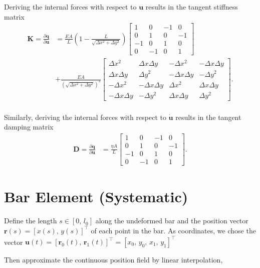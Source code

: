 Deriving the internal forces with respect to $\boldsymbol{u}$ results in the tangent stiffness matrix
%
\begin{align*}
\boldsymbol{K} = \frac{\partial \boldsymbol{q}}{\partial \boldsymbol{u}} &=
\frac{EA}{L}\left(1 - \frac{L}{\sqrt{\Delta x^2 + \Delta y^2}}\right)
\begin{bmatrix}
1 & 0 & -1 & 0\\
0 & 1 & 0 & -1\\
-1 & 0 & 1 & 0\\
0 & -1 & 0 & 1
\end{bmatrix}\\
&+
\frac{EA}{(\sqrt{\Delta x^2 + \Delta y^2})^{3}}
\begin{bmatrix}
\Delta x^2 & \Delta x \Delta y & -\Delta x^2 & -\Delta x \Delta y\\
\Delta x \Delta y & \Delta y^2 & -\Delta x \Delta y & - \Delta y^2\\
-\Delta x^2 & -\Delta x \Delta y & \Delta x^2 & \Delta x \Delta y\\
-\Delta x \Delta y & -\Delta y^2 & \Delta x \Delta y & \Delta y^2
\end{bmatrix}.\\
\end{align*}

Similarly, deriving the internal forces with respect to $\dot{\boldsymbol{u}}$ results in the tangent damping matrix
%
\begin{align*}
\boldsymbol{D} = \frac{\partial \boldsymbol{q}}{\partial \dot{\boldsymbol{u}}} &=
\frac{\eta A}{L}
\begin{bmatrix}
1 & 0 & -1 & 0\\
0 & 1 & 0 & -1\\
-1 & 0 & 1 & 0\\
0 & -1 & 0 & 1
\end{bmatrix}.
\end{align*}

\newpage
\section{Bar Element (Systematic)}

Define the length $s \in [0,\,l_{0}]$ along the undeformed bar and the position vector $\boldsymbol{r}(s) = [x(s),\,y(s)]^\intercal$ of each point in the bar.
As coordinates, we chose the vector $\boldsymbol{u}(t) = [\boldsymbol{r}_{0}(t),\,\boldsymbol{r}_{1}(t)]^\intercal = [x_0,\,y_0,\,x_1,\,y_1]^\intercal$

Then approximate the continuous position field by linear interpolation,

